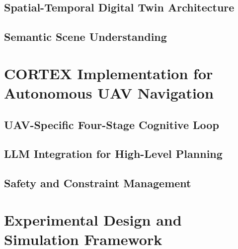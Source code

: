 \subsection{Spatial-Temporal Digital Twin Architecture}

\subsection{Semantic Scene Understanding}

\section{CORTEX Implementation for Autonomous UAV Navigation}

\subsection{UAV-Specific Four-Stage Cognitive Loop}

\subsection{LLM Integration for High-Level Planning}

\subsection{Safety and Constraint Management}

\section{Experimental Design and Simulation Framework}

